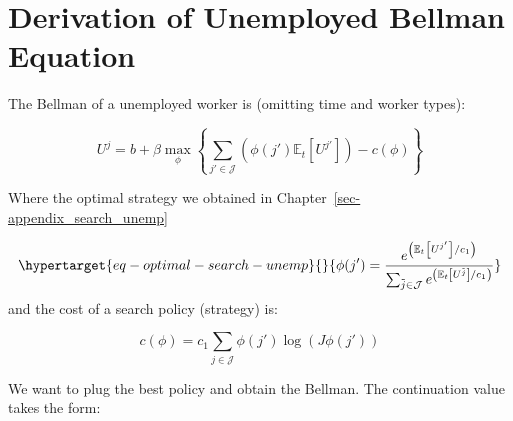 \documentclass[
  letterpaper,
  DIV=11,
  numbers=noendperiod]{scrreprt}
\begin{document}
\hypertarget{sec-appendix_bellman_unemp}{%
\chapter{Derivation of Unemployed Bellman
Equation}\label{sec-appendix_bellman_unemp}}

The Bellman of a unemployed worker is (omitting time and worker types):

\[U^{j} = b + \beta\max_{\phi}\left\{\sum_{j'\in \mathcal{J}} \left(\phi(j')\mathbb{E}_t\left[U^{j'} \right]\right) -c(\phi) \right\}\]

Where the optimal strategy we obtained in
Chapter~\ref{sec-appendix_search_unemp}

\begin{equation}\protect\hypertarget{eq-optimal-search-unemp}{}{\phi(j') = \frac{e^{\left(\mathbb{E}_t\left[U^{j'}\right] /c_1\right)}}{\sum_{\tilde{j}\in \mathcal{J}}e^{\left(\mathbb{E}_t\left[U^{\tilde{j}}\right] /c_1\right)}}}\label{eq-optimal-search-unemp}\end{equation}
and the cost of a search policy (strategy) is:

\[c(\phi) = c_{1} \sum_{j\in \mathcal{J}}\phi(j')\log(J \phi(j'))\]

We want to plug the best policy and obtain the Bellman. The continuation
value takes the form:
\end{document}
